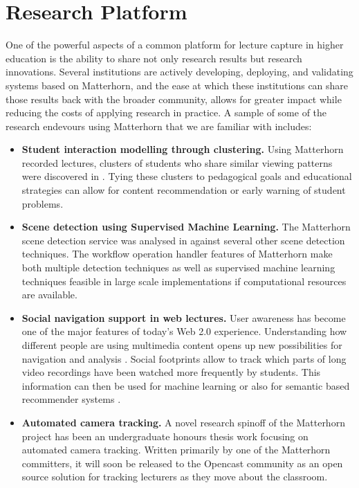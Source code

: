 \documentclass{sig-alternate}
\begin{document}
\section{Research Platform}
One of the powerful aspects of a common platform for lecture capture in higher education is the ability to share not only research results but research innovations.  Several institutions are actively developing, deploying, and validating systems based on Matterhorn, and the ease at which these institutions can share those results back with the broader community, allows for greater impact while reducing the costs of applying research in practice.
A sample of some of the research endevours using Matterhorn that we are familiar with includes:
\begin{itemize}
\item \textbf{Student interaction modelling through clustering.}   Using Matterhorn recorded lectures, clusters of students who share similar viewing patterns were discovered in \cite{Brooks2010}.  Tying these clusters to pedagogical goals and educational strategies can allow for content recommendation or early warning of student problems.
\item \textbf{Scene detection using Supervised Machine Learning.}  The Matterhorn scene detection service was analysed in \cite{Johnston2011} against several other scene detection techniques.  The workflow operation handler features of Matterhorn make both multiple detection techniques as well as supervised machine learning techniques feasible in large scale implementations if computational resources are available.
\item \textbf{Social navigation support in web lectures.} User awareness has become one of the major features of today's Web 2.0 experience. Understanding how different people are using multimedia content opens up new possibilities for navigation and analysis \cite{KMV09}. Social footprints allow to track which parts of long video recordings have been watched more frequently by students. This information can then be used for machine learning or also for semantic based recommender systems \cite{Ketterl:2010:USN:1912600.1912699}.
\item \textbf{Automated camera tracking.} A novel research spinoff of the Matterhorn project has been an undergraduate honours thesis work focusing on automated camera tracking.  Written primarily by one of the Matterhorn committers, it will soon be released to the Opencast community as an open source solution for tracking lecturers as they move about the classroom.
\end{itemize}
\end{document}

